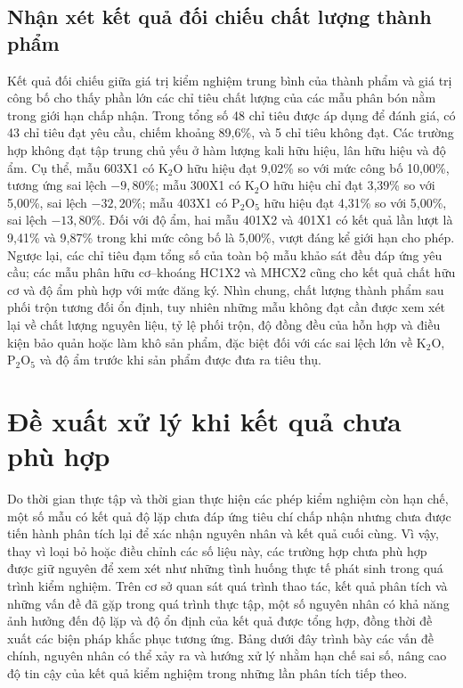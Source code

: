 \subsection{Nhận xét kết quả đối chiếu chất lượng thành phẩm}
Kết quả đối chiếu giữa giá trị kiểm nghiệm trung bình của thành phẩm và giá trị công bố cho thấy phần lớn các chỉ tiêu chất lượng của các mẫu phân bón nằm trong giới hạn chấp nhận. Trong tổng số 48 chỉ tiêu được áp dụng để đánh giá, có 43 chỉ tiêu đạt yêu cầu, chiếm khoảng 89,6\%, và 5 chỉ tiêu không đạt. Các trường hợp không đạt tập trung chủ yếu ở hàm lượng kali hữu hiệu, lân hữu hiệu và độ ẩm. Cụ thể, mẫu 603X1 có \(\mathrm{K_2O}\) hữu hiệu đạt 9,02\% so với mức công bố 10,00\%, tương ứng sai lệch \(-9,80\%\); mẫu 300X1 có \(\mathrm{K_2O}\) hữu hiệu chỉ đạt 3,39\% so với 5,00\%, sai lệch \(-32,20\%\); mẫu 403X1 có \(\mathrm{P_2O_5}\) hữu hiệu đạt 4,31\% so với 5,00\%, sai lệch \(-13,80\%\). Đối với độ ẩm, hai mẫu 401X2 và 401X1 có kết quả lần lượt là 9,41\% và 9,87\% trong khi mức công bố là 5,00\%, vượt đáng kể giới hạn cho phép. Ngược lại, các chỉ tiêu đạm tổng số của toàn bộ mẫu khảo sát đều đáp ứng yêu cầu; các mẫu phân hữu cơ--khoáng HC1X2 và MHCX2 cũng cho kết quả chất hữu cơ và độ ẩm phù hợp với mức đăng ký. Nhìn chung, chất lượng thành phẩm sau phối trộn tương đối ổn định, tuy nhiên những mẫu không đạt cần được xem xét lại về chất lượng nguyên liệu, tỷ lệ phối trộn, độ đồng đều của hỗn hợp và điều kiện bảo quản hoặc làm khô sản phẩm, đặc biệt đối với các sai lệch lớn về \(\mathrm{K_2O}\), \(\mathrm{P_2O_5}\) và độ ẩm trước khi sản phẩm được đưa ra tiêu thụ.

\section{Đề xuất xử lý khi kết quả chưa phù hợp}
Do thời gian thực tập và thời gian thực hiện các phép kiểm nghiệm còn hạn chế, một số mẫu có kết quả độ lặp chưa đáp ứng tiêu chí chấp nhận nhưng chưa được tiến hành phân tích lại để xác nhận nguyên nhân và kết quả cuối cùng. Vì vậy, thay vì loại bỏ hoặc điều chỉnh các số liệu này, các trường hợp chưa phù hợp được giữ nguyên để xem xét như những tình huống thực tế phát sinh trong quá trình kiểm nghiệm. Trên cơ sở quan sát quá trình thao tác, kết quả phân tích và những vấn đề đã gặp trong quá trình thực tập, một số nguyên nhân có khả năng ảnh hưởng đến độ lặp và độ ổn định của kết quả được tổng hợp, đồng thời đề xuất các biện pháp khắc phục tương ứng. Bảng dưới đây trình bày các vấn đề chính, nguyên nhân có thể xảy ra và hướng xử lý nhằm hạn chế sai số, nâng cao độ tin cậy của kết quả kiểm nghiệm trong những lần phân tích tiếp theo.


